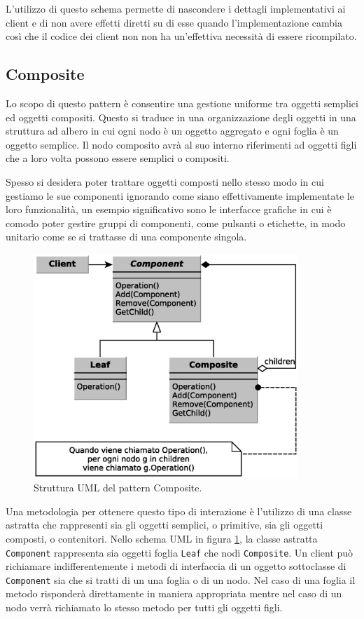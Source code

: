 L'utilizzo di questo schema permette di nascondere i dettagli implementativi ai client e di non avere effetti diretti su di esse quando l'implementazione cambia così che il codice dei client non non ha un'effettiva necessità di essere ricompilato. 

\subsection{Composite}
\label{sub:composite}
Lo scopo di questo pattern è consentire una gestione uniforme tra oggetti semplici ed oggetti compositi. Questo si traduce in una organizzazione degli oggetti in una struttura ad albero in cui ogni nodo è un oggetto aggregato e ogni foglia è un oggetto semplice.
Il nodo composito avrà al suo interno riferimenti ad oggetti figli che a loro volta possono essere semplici o compositi.

Spesso si desidera poter trattare oggetti composti nello stesso modo in cui gestiamo le sue componenti ignorando come siano effettivamente implementate le loro funzionalità, un esempio significativo sono le interfacce grafiche in cui è comodo poter gestire gruppi di componenti, come pulsanti o etichette, in modo unitario come se si trattasse di una componente singola.

\begin{figure}
\begin{center}
\includegraphics[width=10cm]{Immagini/CompositePattern}
\caption{Struttura UML del pattern Composite.\label{f:compositepattern}} 
\end{center} 
\end{figure}

Una metodologia per ottenere questo tipo di interazione è l'utilizzo di una classe astratta che rappresenti sia gli oggetti semplici, o primitive, sia gli oggetti composti, o contenitori. Nello schema \ac{UML} in figura \ref{f:compositepattern}, la classe astratta \texttt{Component} rappresenta sia oggetti foglia \texttt{Leaf} che nodi \texttt{Composite}. Un client può richiamare indifferentemente i metodi di interfaccia di un oggetto sottoclasse di \texttt{Component} sia che si tratti di un una foglia o di un nodo. Nel caso di una foglia il metodo risponderà direttamente in maniera appropriata mentre nel caso di un nodo verrà richiamato lo stesso metodo per tutti gli oggetti figli.

